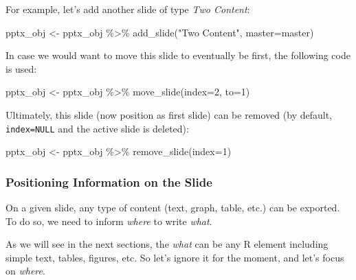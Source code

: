 \documentclass[
]{krantz}
\makeatletter
\newenvironment{Shaded}{\begin{snugshade}}{\end{snugshade}}
\newcommand{\AttributeTok}[1]{\textcolor[rgb]{0.61,0.61,0.61}{#1}}
\newcommand{\DecValTok}[1]{\textcolor[rgb]{0.06,0.06,0.06}{#1}}
\newcommand{\FunctionTok}[1]{\textcolor[rgb]{0,0,0}{#1}}
\newcommand{\NormalTok}[1]{#1}
\newcommand{\OtherTok}[1]{\textcolor[rgb]{0.37,0.37,0.37}{#1}}
\newcommand{\SpecialCharTok}[1]{\textcolor[rgb]{0,0,0}{#1}}
\newcommand{\StringTok}[1]{\textcolor[rgb]{0.5,0.5,0.5}{#1}}
\newenvironment{kframe}{%
\medskip{}
\setlength{\fboxsep}{.8em}
 \def\at@end@of@kframe{}%
 \ifinner\ifhmode%
  \def\at@end@of@kframe{\end{minipage}}%
  \begin{minipage}{\columnwidth}%
 \fi\fi%
 \def\FrameCommand##1{\hskip\@totalleftmargin \hskip-\fboxsep
 \colorbox{shadecolor}{##1}\hskip-\fboxsep
     \hskip-\linewidth \hskip-\@totalleftmargin \hskip\columnwidth}%
 \MakeFramed {\advance\hsize-\width
   \@totalleftmargin\z@ \linewidth\hsize
   \@setminipage}}%
 {\par\unskip\endMakeFramed%
 \at@end@of@kframe}
\renewenvironment{Shaded}{\begin{kframe}}{\end{kframe}}
\makeatother
\begin{document}
For example, let's add another slide of type \emph{Two Content}:

\begin{Shaded}
\begin{Highlighting}[]
\NormalTok{pptx\_obj }\OtherTok{\textless{}{-}}\NormalTok{ pptx\_obj }\SpecialCharTok{\%\textgreater{}\%} 
  \FunctionTok{add\_slide}\NormalTok{(}\StringTok{"Two Content"}\NormalTok{, }\AttributeTok{master=}\NormalTok{master)}
\end{Highlighting}
\end{Shaded}

In case we would want to move this slide to eventually be first, the following code is used:

\begin{Shaded}
\begin{Highlighting}[]
\NormalTok{pptx\_obj }\OtherTok{\textless{}{-}}\NormalTok{ pptx\_obj }\SpecialCharTok{\%\textgreater{}\%} 
  \FunctionTok{move\_slide}\NormalTok{(}\AttributeTok{index=}\DecValTok{2}\NormalTok{, }\AttributeTok{to=}\DecValTok{1}\NormalTok{)}
\end{Highlighting}
\end{Shaded}

Ultimately, this slide (now position as first slide) can be removed (by default, \texttt{index=NULL} and the active slide is deleted):

\begin{Shaded}
\begin{Highlighting}[]
\NormalTok{pptx\_obj }\OtherTok{\textless{}{-}}\NormalTok{ pptx\_obj }\SpecialCharTok{\%\textgreater{}\%} 
  \FunctionTok{remove\_slide}\NormalTok{(}\AttributeTok{index=}\DecValTok{1}\NormalTok{)}
\end{Highlighting}
\end{Shaded}

\hypertarget{positioning-information-on-the-slide}{%
\subsubsection*{Positioning Information on the Slide}\label{positioning-information-on-the-slide}}


On a given slide, any type of content (text, graph, table, etc.) can be exported. To do so, we need to inform \emph{where} to write \emph{what}.

As we will see in the next sections, the \emph{what} can be any R element including simple text, tables, figures, etc. So let's ignore it for the moment, and let's focus on \emph{where}.
\end{document}

